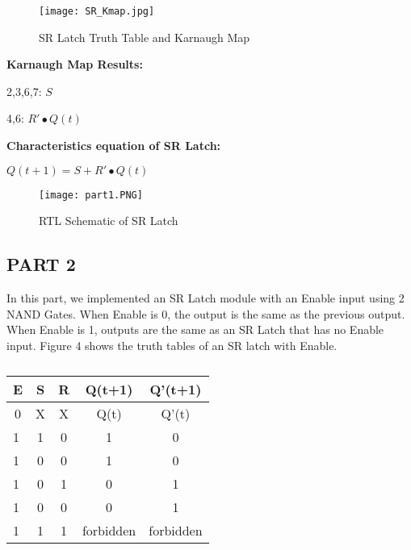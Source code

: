 \documentclass[pdftex,12pt,a4paper]{article}
\begin{document}
\begin{figure}[ht]
	\centering
	\texttt{[image: SR\_Kmap.jpg]}	
	\caption{SR Latch Truth Table and Karnaugh Map}
	\label{fig1}
\end{figure}





\textbf{Karnaugh Map Results:}

2,3,6,7: \(S\)

4,6: \(R'•Q(t)\)

\textbf{Characteristics equation of SR Latch:}

\(Q (t+1) = S + R'•Q(t)\)

\begin{figure}[ht]
	\centering
	\texttt{[image: part1.PNG]}	
	\caption{RTL Schematic of SR Latch}
	\label{fig2}
\end{figure}



\clearpage


\subsection{PART 2}
In this part, we implemented an SR Latch module with an Enable input using 2 NAND Gates.  When Enable is 0, the output is the same as the previous output. When Enable is 1, outputs are the same as an SR Latch that has no Enable input. Figure 4 shows the truth tables of an SR latch with Enable.

\begin{table}[h!]
\begin{tabular}{|l|c|c|c|c|}
\hline
E                       & S & R & Q(t+1)    & Q'(t+1)   \\ \hline
\multicolumn{1}{|c|}{0} & X & X & Q(t)      & Q'(t)     \\ \hline
1                       & 1 & 0 & 1         & 0         \\ \hline
1                       & 0 & 0 & 1         & 0         \\ \hline
1                       & 0 & 1 & 0         & 1         \\ \hline
1                       & 0 & 0 & 0         & 1         \\ \hline
1                       & 1 & 1 & forbidden & forbidden \\ \hline
\end{tabular}
\caption{\label{tab:table-name}}
\end{table}
\end{document}
